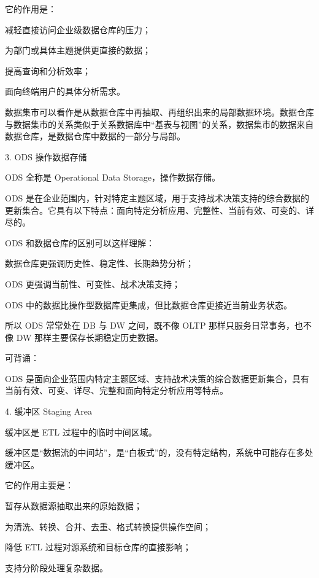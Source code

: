 \documentclass[UTF8,zihao=-4]{ctexart}
\begin{document}
它的作用是：\par

减轻直接访问企业级数据仓库的压力；\par
为部门或具体主题提供更直接的数据；\par
提高查询和分析效率；\par
面向终端用户的具体分析需求。\par

数据集市可以看作是从数据仓库中再抽取、再组织出来的局部数据环境。数据仓库与数据集市的关系类似于关系数据库中“基表与视图”的关系，数据集市的数据来自数据仓库，是数据仓库中数据的一部分与局部。\par

3. ODS 操作数据存储\par

ODS 全称是 Operational Data Storage，操作数据存储。\par

ODS 是在企业范围内，针对特定主题区域，用于支持战术决策支持的综合数据的更新集合。它具有以下特点：面向特定分析应用、完整性、当前有效、可变的、详尽的。\par

ODS 和数据仓库的区别可以这样理解：\par

数据仓库更强调历史性、稳定性、长期趋势分析；\par
ODS 更强调当前性、可变性、战术决策支持；\par
ODS 中的数据比操作型数据库更集成，但比数据仓库更接近当前业务状态。\par

所以 ODS 常常处在 DB 与 DW 之间，既不像 OLTP 那样只服务日常事务，也不像 DW 那样主要保存长期稳定历史数据。\par

可背诵：\par
ODS 是面向企业范围内特定主题区域、支持战术决策的综合数据更新集合，具有当前有效、可变、详尽、完整和面向特定分析应用等特点。\par

4. 缓冲区 Staging Area\par

缓冲区是 ETL 过程中的临时中间区域。\par

缓冲区是“数据流的中间站”，是“白板式”的，没有特定结构，系统中可能存在多处缓冲区。\par

它的作用主要是：\par

暂存从数据源抽取出来的原始数据；\par
为清洗、转换、合并、去重、格式转换提供操作空间；\par
降低 ETL 过程对源系统和目标仓库的直接影响；\par
支持分阶段处理复杂数据。\par
\end{document}
